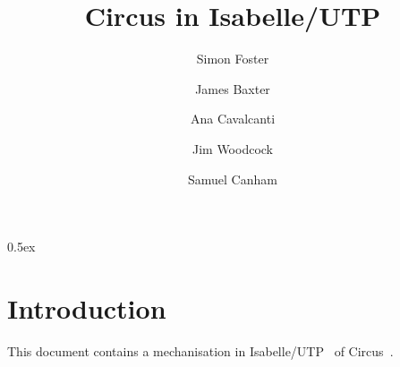 \documentclass[11pt,a4paper]{article}
\begin{document}
\title{Circus in Isabelle/UTP}

\author{Simon Foster \and James Baxter \and Ana Cavalcanti \and Jim Woodcock \and Samuel Canham}

\maketitle

\tableofcontents

\parindent 0pt\parskip 0.5ex

\section{Introduction}

This document contains a mechanisation in Isabelle/UTP~\cite{Foster16a} of Circus~\cite{Oliveira2005-PHD}.





\end{document}
